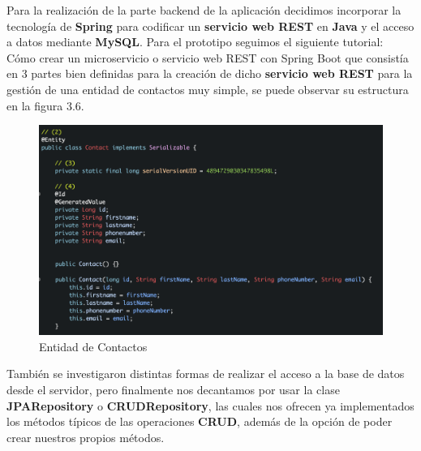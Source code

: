 \begin{flushleft}
    Para la realización de la parte backend de la aplicación decidimos
    incorporar la tecnología de \textbf{Spring} para codificar un \textbf{servicio web REST} en \textbf{Java}
    y el acceso a datos mediante \textbf{MySQL}.
\break
\break
    Para el prototipo seguimos el siguiente tutorial: 
\newline
Cómo crear un microservicio o servicio web REST con Spring Boot\cite{tutorialspring}
\break
    que consistía en 3 partes bien definidas para la creación de dicho \textbf{servicio web REST} para la gestión de una entidad de contactos muy simple, se puede observar su estructura
    en la figura 3.6.
    \begin{figure}[H]
        \centering
        \includegraphics[width=6in]{figures/ContactsEntity.png}
        \caption{Entidad de Contactos}
    \end{figure}
\break
\break
    También se investigaron distintas formas de realizar el acceso a la base de datos desde el servidor, pero finalmente nos decantamos por usar la
    clase \textbf{JPARepository} o \textbf{CRUDRepository}, las cuales nos ofrecen ya implementados los métodos típicos de las operaciones \textbf{CRUD}, además de la opción 
    de poder crear nuestros propios métodos.
\end{flushleft}

